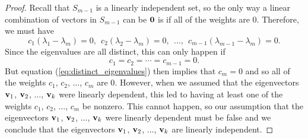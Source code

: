 \begin{proof}
Recall that $S_{m-1}$ is a linearly independent set, so the only way a linear combination of vectors in $S_{m-1}$ can be $\mathbf{0}$ is if all of the weights are 0. Therefore, we must have
\[c_{1}(\lambda_{1}-\lambda_m) = 0, \ \ c_{2}(\lambda_{2}-\lambda_m) = 0, \ \ \ldots, \ \ c_{m-1} (\lambda_{m-1}-\lambda_m) = 0.\]
Since the eigenvalues are all distinct, this can only happen if
\[c_1 = c_2 = \cdots = c_{m-1} = 0.\]
But equation (\ref{eq:distinct_eigenvalues}) then implies that $c_m = 0$ and so all of the weights $c_1$, $c_2$, $\ldots$, $c_m$ are 0. However, when we assumed that the eigenvectors $\mathbf{v}_1$, $\mathbf{v}_2$, $\ldots$, $\mathbf{v}_k$ were linearly dependent, this led to having at least one of the weights $c_1$, $c_2$, $\ldots$, $c_m$ be nonzero. This cannot happen, so our assumption that the eigenvectors $\mathbf{v}_1$, $\mathbf{v}_2$, $\ldots$, $\mathbf{v}_k$ were linearly dependent must be false and we conclude that the eigenvectors $\mathbf{v}_1$, $\mathbf{v}_2$, $\ldots$, $\mathbf{v}_k$ are linearly independent.
\end{proof}



\label{sec:egspace_exam}

\ExampleIntro

